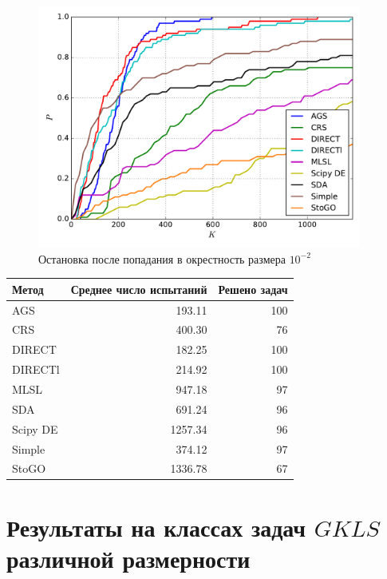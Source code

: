 \documentclass[a4paper]{article}
\begin{document}
\begin{figure}[H]
  \center
  \includegraphics[width=0.95\textwidth]{../experiments/grish/cmc.pdf}
  \caption{Остановка после попадания в окрестность размера $10^{-2}$}
  \label{fig:}
\end{figure}

\begin{tabular}{lrr}
\hline
 Метод    &   Среднее число испытаний &   Решено задач \\
\hline
 AGS      &                    193.11 &            100 \\
 CRS      &                    400.30 &             76 \\
 DIRECT   &                    182.25 &            100 \\
 DIRECTl  &                    214.92 &            100 \\
 MLSL     &                    947.18 &             97 \\
 SDA      &                    691.24 &             96 \\
 Scipy DE &                   1257.34 &             96 \\
 Simple   &                    374.12 &             97 \\
 StoGO    &                   1336.78 &             67 \\
\hline
\end{tabular}
\section{Результаты на классах задач $GKLS$ различной размерности}
\end{document}
